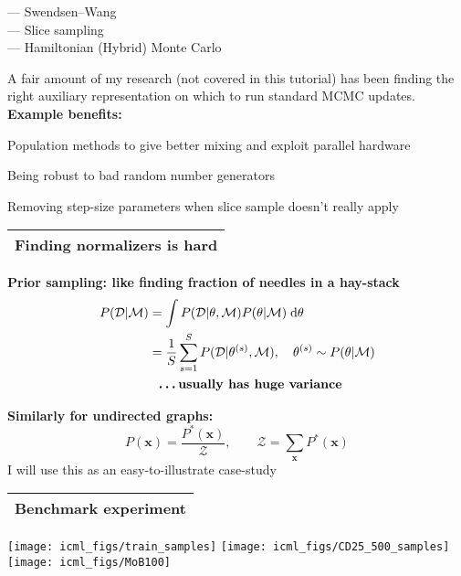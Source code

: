 \documentclass[25pt,landscape]{foils}
\newcommand{\Gray}{\textcolor{mygray}}
\newcommand{\Green}{\textcolor{mypine}}
\newcommand{\myfoilhead}[1]{
\newpage
\vspace*{-1cm}
\Gray{
\begin{tabular*}{\textwidth}{l}
{\bf \Huge #1} \\
\bottomrule
\end{tabular*}}}
\newcommand{\bx}{\mathbf{x}}
\newcommand{\D}{\mathcal{D}}
\newcommand{\M}{\mathcal{M}}
\newcommand{\Z}{\mathcal{Z}}
\begin{document}
--- Swendsen--Wang\\
--- Slice sampling\\
--- Hamiltonian (Hybrid) Monte Carlo

\vfill

A fair amount of my research (not covered in this tutorial) has been finding the
right auxiliary representation on which to run standard MCMC updates.\\

{\bf Example benefits:}

\bigskip
Population methods to give better mixing and exploit parallel hardware

\bigskip

Being robust to bad random number generators

\bigskip
Removing step-size parameters when slice sample doesn't really apply



\myfoilhead{Finding normalizers is hard}

\vspace*{1.5cm}

{\bf \Green{Prior sampling:} like finding fraction of needles in a hay-stack}
\[
\begin{split}
P(\D|\M) &= \int P(\D|\theta,\M) P(\theta|\M)\;\mathrm{d}\theta\\
&= \frac{1}{S} \sum_{s=1}^S P(\D|\theta^{(s)},\M), \quad \theta^{(s)}\sim P(\theta|\M)\\
&\phantom{= }\mbox{\bf \dots usually has huge variance}
\end{split}
\]

\vspace*{1cm}

\Green{\bf Similarly for undirected graphs:}
\[
    P(\bx) = \frac{P^*(\bx)}{\Z}, \qquad \Z = \sum_{\bx} P^*(\bx)
\]
I will use this as an easy-to-illustrate case-study

\myfoilhead{Benchmark experiment}

\vfill

\hspace*{\fill}
\texttt{[image: icml\_figs/train\_samples]}
\hspace*{\fill}
\texttt{[image: icml\_figs/CD25\_500\_samples]}
\hspace*{\fill}
\texttt{[image: icml\_figs/MoB100]}
\hspace*{\fill}
\bigskip
\end{document}
